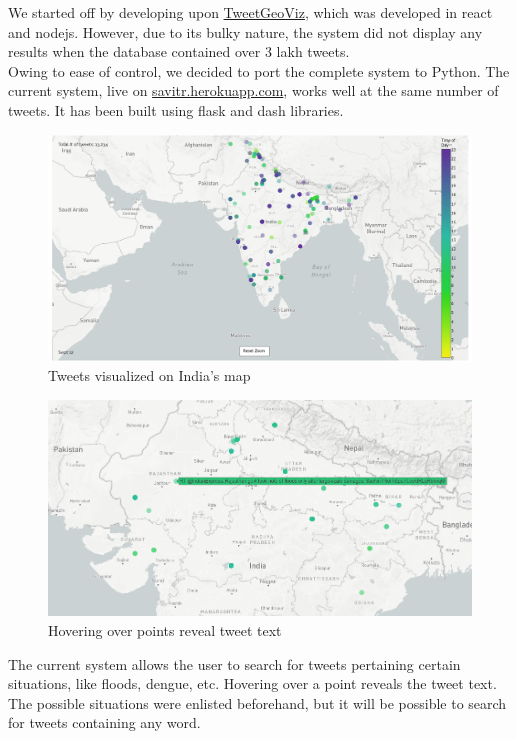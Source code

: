 \documentclass[journal, a4paper]{IEEEtran}
\begin{document}
We started off by developing upon \href{https://github.com/JaredHawkins/TweetGeoViz}{TweetGeoViz}, which was developed in react and nodejs. 
However, due to its bulky nature, the system did not display any results when the database contained over 3 lakh tweets.\\

Owing to ease of control, we decided to port the complete system to Python. The current system, live on \href{http://savitr.herokuapp.com}{savitr.herokuapp.com}, works well at the same number of tweets. It has been built using flask and dash libraries.

\begin{figure}[h!]
	\centering
	\includegraphics[width=\columnwidth]{map_general.png}
	\caption{ Tweets visualized on India’s map}
	\label{fig:map_general}
\end{figure}


\begin{figure}[h!]
	\centering
	\includegraphics[width=\columnwidth]{map_hovertext.png}
	\caption{Hovering over points reveal tweet text}
	\label{fig:map_hovertext}
\end{figure}


The current system allows the user to search for tweets pertaining certain situations, like floods, dengue, etc. Hovering over a point reveals the tweet text. The possible situations were enlisted beforehand, but it will be possible to search for tweets containing any word.
\end{document}
